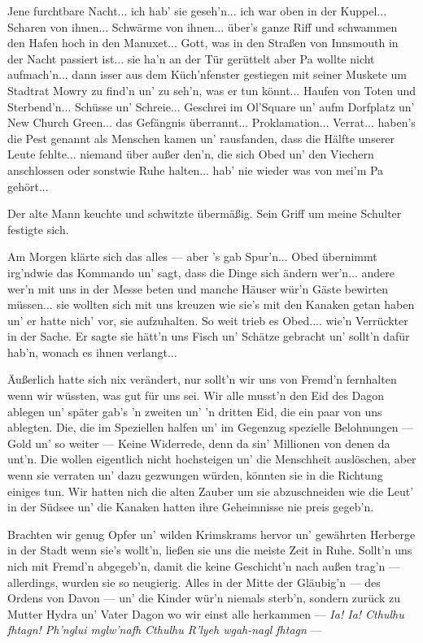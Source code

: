 \glqq Jene furchtbare Nacht... ich hab' sie geseh'n... ich war oben in der Kuppel... Scharen von ihnen... Schwärme von ihnen... über's ganze Riff und schwammen den Hafen hoch in den Manuxet... Gott, was in den Straßen von Innsmouth in der Nacht passiert ist... sie ha'n an der Tür gerüttelt aber Pa wollte nicht aufmach'n... dann isser aus dem Küch'nfenster gestiegen mit seiner Muskete um Stadtrat Mowry zu find'n un' zu seh'n, was er tun könnt... Haufen von Toten und Sterbend'n... Schüsse un' Schreie... Geschrei im Ol'Square un' aufm Dorfplatz un' New Church Green... das Gefängnis überrannt... Proklamation... Verrat... haben's die Pest genannt als Menschen kamen un' rausfanden, dass die Hälfte unserer Leute fehlte... niemand über außer den'n, die sich Obed un' den Viechern anschlossen oder sonstwie Ruhe halten... hab' nie wieder was von mei'm Pa gehört...\grqq

Der alte Mann keuchte und schwitzte übermäßig. Sein Griff um meine Schulter festigte sich.

\glqq Am Morgen klärte sich das alles --- aber 's gab Spur'n... Obed übernimmt irg'ndwie das Kommando un' sagt, dass die Dinge sich ändern wer'n... andere wer'n mit uns in der Messe beten und manche Häuser wür'n Gäste bewirten müssen... sie wollten sich mit uns kreuzen wie sie's mit den Kanaken getan haben un' er hatte nich' vor, sie aufzuhalten. So weit trieb es Obed.... wie'n Verrückter in der Sache. Er sagte sie hätt'n uns Fisch un' Schätze gebracht un' sollt'n dafür hab'n, wonach es ihnen verlangt...

Äußerlich hatte sich nix verändert, nur sollt'n wir uns von Fremd'n fernhalten wenn wir wüssten, was gut für uns sei. Wir alle musst'n den Eid des Dagon ablegen un' später gab's 'n zweiten un' 'n dritten Eid, die ein paar von uns ablegten. Die, die im Speziellen halfen un' im Gegenzug spezielle Belohnungen --- Gold un' so weiter --- Keine Widerrede, denn da sin' Millionen von denen da unt'n. Die wollen eigentlich nicht hochsteigen un' die Menschheit auslöschen, aber wenn sie verraten un' dazu gezwungen würden, könnten sie in die Richtung einiges tun. Wir hatten nich die alten Zauber um sie abzuschneiden wie die Leut' in der Südsee un' die Kanaken hatten ihre Geheimnisse nie preis gegeb'n.

Brachten wir genug Opfer un' wilden Krimskrams hervor un' gewährten Herberge in der Stadt wenn sie's wollt'n, ließen sie uns die meiste Zeit in Ruhe. Sollt'n uns nich mit Fremd'n abgegeb'n, damit die keine Geschicht'n nach außen trag'n --- allerdings, wurden sie so neugierig. Alles in der Mitte der Gläubig'n --- des Ordens von Davon --- un' die Kinder wür'n niemals sterb'n, sondern zurück zu Mutter Hydra un' Vater Dagon wo wir einst alle herkammen --- \textit{Ia! Ia! Cthulhu fhtagn! Ph’nglui mglw’nafh Cthulhu R’lyeh wgah-nagl fhtagn} ---
\grqq

